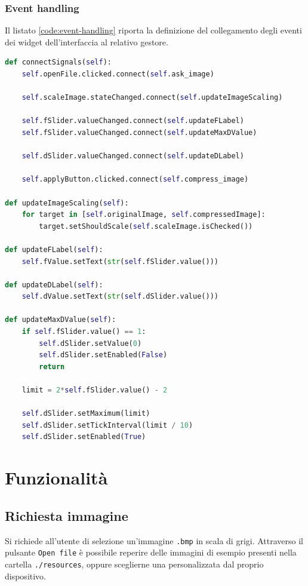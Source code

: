 \documentclass[11pt,italian]{article}
\begin{document}
\subsubsection*{Event handling}
Il listato \cref{code:event-handling} riporta la definizione del collegamento degli eventi dei widget dell'interfaccia al relativo gestore.
\begin{lstlisting}[language=Python,emph={self},label=code:event-handling,caption=Event-handling dei segnali dei widget]
def connectSignals(self):
    self.openFile.clicked.connect(self.ask_image)

    self.scaleImage.stateChanged.connect(self.updateImageScaling)

    self.fSlider.valueChanged.connect(self.updateFLabel)
    self.fSlider.valueChanged.connect(self.updateMaxDValue)

    self.dSlider.valueChanged.connect(self.updateDLabel)

    self.applyButton.clicked.connect(self.compress_image)

def updateImageScaling(self):
    for target in [self.originalImage, self.compressedImage]:
        target.setShouldScale(self.scaleImage.isChecked())

def updateFLabel(self):
    self.fValue.setText(str(self.fSlider.value()))

def updateDLabel(self):
    self.dValue.setText(str(self.dSlider.value()))

def updateMaxDValue(self):
    if self.fSlider.value() == 1:
        self.dSlider.setValue(0)
        self.dSlider.setEnabled(False)
        return

    limit = 2*self.fSlider.value() - 2

    self.dSlider.setMaximum(limit)
    self.dSlider.setTickInterval(limit / 10)
    self.dSlider.setEnabled(True)
\end{lstlisting}

\newpage
\section{Funzionalità}
\subsection{Richiesta immagine}
Si richiede all'utente di selezione un'immagine \lstinline{.bmp} in scala di grigi. Attraverso il pulsante \lstinline{Open file} è possibile reperire delle immagini di esempio presenti nella cartella \lstinline{./resources}, oppure sceglierne una personalizzata dal proprio dispositivo.
\end{document}
